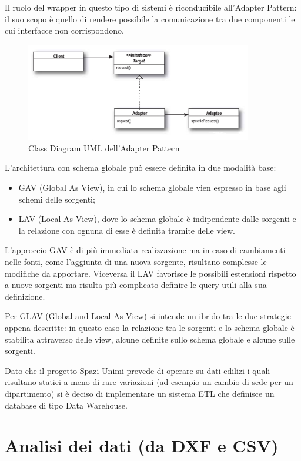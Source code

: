 \documentclass[12pt]{report}
\begin{document}
Il ruolo del wrapper in questo tipo di sistemi è riconducibile all'Adapter Pattern: il suo scopo è quello di rendere possibile la comunicazione tra due componenti le cui interfacce non corrispondono.

\begin{figure}[H]
    \centering
    \includegraphics[width=280pt]{Adapter.jpg}
    \caption{Class Diagram UML dell'Adapter Pattern}
    \label{fig:Adapter_Pattern}
\end{figure}

L'architettura con schema globale può essere definita in due modalità base:
\begin{itemize}
\item GAV (Global As View), in cui lo schema globale vien espresso in base agli schemi delle sorgenti;
\item LAV (Local As View), dove lo schema globale è indipendente dalle sorgenti e la relazione con ognuna di esse è definita tramite delle view. 
\end{itemize}

L'approccio GAV è di più immediata realizzazione ma in caso di cambiamenti nelle fonti, come l'aggiunta di una nuova sorgente, risultano complesse le modifiche da apportare.
Viceversa il LAV favorisce le possibili estensioni rispetto a nuove sorgenti ma risulta più complicato definire le query utili alla sua definizione.     

Per GLAV (Global and Local As View) si intende un ibrido tra le due strategie appena descritte: in questo caso la relazione tra le sorgenti e lo schema globale è stabilita attraverso delle view, alcune definite sullo schema globale e alcune sulle sorgenti.

Dato che il progetto Spazi-Unimi prevede di operare su dati edilizi i quali risultano statici a meno di rare variazioni (ad esempio un cambio di sede per un dipartimento) si è deciso di implementare un sistema ETL che definisce un database di tipo Data Warehouse.


\newpage
\section{Analisi dei dati (da DXF e CSV)}
\end{document}
